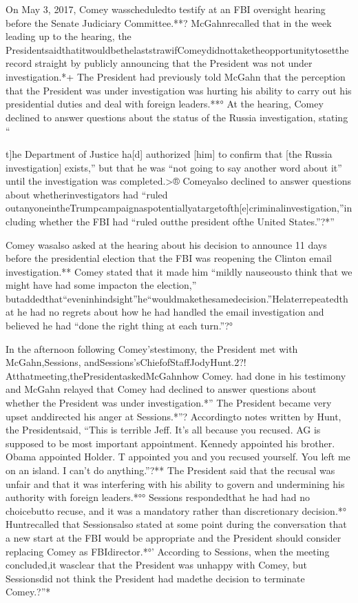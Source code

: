 On May 3, 2017, Comey wasscheduledto testify at an FBI oversight hearing before the Senate Judiciary Committee.**? McGahnrecalled that in the week leading up to the hearing, the PresidentsaidthatitwouldbethelaststrawifComeydidnottaketheopportunitytosettherecord straight by publicly announcing that the President was not under investigation.*+ The President had previously told McGahn that the perception that the President was under investigation was hurting his ability to carry out his presidential duties and deal with foreign leaders.**° At the hearing, Comey declined to answer questions about the status of the Russia investigation, stating “{t]he Department of Justice ha[d] authorized [him] to confirm that [the Russia investigation] exists,” but that he was “not going to say another word about it” until the investigation was completed.>® Comeyalso declined to answer questions about whetherinvestigators had “ruled outanyoneintheTrumpcampaignaspotentiallyatargetofth[e]criminalinvestigation,”including whether the FBI had “ruled outthe president ofthe United States.”?*”

Comey wasalso asked at the hearing about his decision to announce 11 days before the presidential election that the FBI was reopening the Clinton email investigation.** Comey stated that it made him “mildly nauseousto think that we might have had some impacton the election,” butaddedthat“eveninhindsight”he“wouldmakethesamedecision.”Helaterrepeatedthat he had no regrets about how he had handled the email investigation and believed he had “done the right thing at each turn.”?°

In the afternoon following Comey’stestimony, the President met with McGahn,Sessions, andSessions’sChiefofStaffJodyHunt.2?! Atthatmeeting,thePresidentaskedMcGahnhow Comey. had done in his testimony and McGahn relayed that Comey had declined to answer questions about whether the President was under investigation.*” The President became very upset anddirected his anger at Sessions.*”? Accordingto notes written by Hunt, the Presidentsaid, “This is terrible Jeff. It’s all because you recused. AG is supposed to be most important appointment. Kennedy appointed his brother. Obama appointed Holder. T appointed you and you recused yourself. You left me on an island. I can’t do anything.”?** The President said that the recusal was unfair and that it was interfering with his ability to govern and undermining his authority with foreign leaders.*°° Sessions respondedthat he had had no choicebutto recuse, and it was a mandatory rather than discretionary decision.*° Huntrecalled that Sessionsalso stated at some point during the conversation that a new start at the FBI would be appropriate and the President should consider replacing Comey as FBIdirector.*°’ According to Sessions, when the meeting concluded,it wasclear that the President was unhappy with Comey, but Sessionsdid not think the President had madethe decision to terminate Comey.?”*

}
